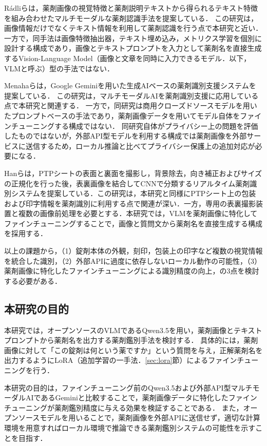 \documentclass[dvipdfmx]{jsarticle}
\begin{document}
Rádliら\cite{radli2024metric}は，薬剤画像の視覚特徴と薬剤説明テキストから得られるテキスト特徴を組み合わせたマルチモーダルな薬剤認識手法を提案している．
この研究は，画像情報だけでなくテキスト情報を利用して薬剤認識を行う点で本研究と近い．
一方で，同手法は画像特徴抽出器，テキスト埋め込み，メトリクス学習を個別に設計する構成であり，画像とテキストプロンプトを入力として薬剤名を直接生成するVision-Language Model（画像と文章を同時に入力できるモデル．以下，VLMと呼ぶ）型の手法ではない．

Menahaら\cite{gemini2024pill}は，Google Geminiを用いた生成AIベースの薬剤識別支援システムを提案している．
この研究は，マルチモーダルAIを薬剤識別支援に応用している点で本研究と関連する．
一方で，同研究は商用クローズドソースモデルを用いたプロンプトベースの手法であり，薬剤画像データを用いてモデル自体をファインチューニングする構成ではない．
同研究自体がプライバシー上の問題を評価したものではないが，外部API型モデルを利用する構成では薬剤画像を外部サービスに送信するため，ローカル推論と比べてプライバシー保護上の追加対応が必要になる．

Hanら\cite{han2021bpis}は，PTPシートの表面と裏面を撮影し，背景除去，向き補正およびサイズの正規化を行った後，表裏画像を結合してCNNで分類するリアルタイム薬剤識別システムを提案している．この研究は，本研究と同様にPTPシート上の包装および印字情報を薬剤識別に利用する点で関連が深い．一方，専用の表裏撮影装置と複数の画像前処理を必要とする．本研究では，VLMを薬剤画像に特化してファインチューニングすることで，画像と質問文から薬剤名を直接生成する構成を採用する．

以上の課題から，（1）錠剤本体の外観，刻印，包装上の印字など複数の視覚情報を統合した識別，（2）外部APIに過度に依存しないローカル動作の可能性，（3）薬剤画像に特化したファインチューニングによる識別精度の向上，の3点を検討する必要がある．

\subsection{本研究の目的}

本研究では，オープンソースのVLMであるQwen3.5を用い，薬剤画像とテキストプロンプトから薬剤名を出力する薬剤鑑別手法を検討する．
具体的には，薬剤画像に対して「この錠剤は何という薬ですか」という質問を与え，正解薬剤名を出力するようにLoRA\cite{hu2022lora}（追加学習の一手法．\ref{sec:lora}節）によるファインチューニングを行う．

本研究の目的は，ファインチューニング前のQwen3.5および外部API型マルチモーダルAIであるGeminiと比較することで，薬剤画像データに特化したファインチューニングが薬剤鑑別精度に与える効果を検証することである．
また，オープンソースモデルを用いることで，薬剤画像を外部APIに送信せず，適切な計算環境を用意すればローカル環境で推論できる薬剤鑑別システムの可能性を示すことを目指す．
\end{document}
